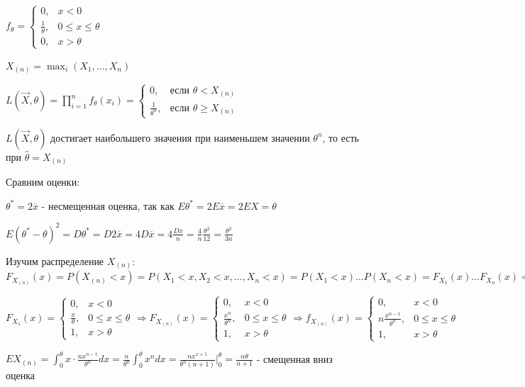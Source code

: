 \documentclass[12pt]{article}
\begin{document}
$f_\theta = \begin{cases}0, & x < 0 \\ \frac{1}{\theta}, & 0 \leq x \leq \theta \\ 0, & x > \theta \end{cases}$

$X_{(n)} = \max_i (X_1, \dots, X_n)$

$L(\vec{X}, \theta) = \prod_{i = 1}^n f_\theta (x_i) = 
\begin{cases}
    0, & \text{если } \theta < X_{(n)} \\ 
    \frac{1}{\theta^n}, & \text{если } \theta \geq X_{(n)}
\end{cases}$

$L(\vec{X}, \theta)$ достигает наибольшего значения при наименьшем значении $\theta^n$, то есть при $\hat{\theta} = X_{(n)}$

Сравним оценки:

$\theta^* = 2 \overline{x}$ - несмещенная оценка, так как $E\theta^* = 2E\overline{x} = 2E X = \theta$

$E(\theta^* - \theta)^2 = D\theta^* = D2\overline{x} = 4D\overline{x} = 4\frac{D\overline{x}}{n} = \frac{4}{n}\frac{\theta^2}{12} = \frac{\theta^2}{3n}$

Изучим распределение $X_{(n)}$: $F_{X_{(n)}}(x) = P(X_{(n)} < x) = P(X_1 < x, X_2 < x, \dots, X_n < x) = 
P(X_1 < x) \dots P(X_n < x) = F_{X_1}(x) \dots F_{X_n}(x) = F^n_{(x_1)}(x)$

$F_{X_1} (x) = \begin{cases}
    0, & x < 0 \\
    \frac{x}{\theta}, & 0 \leq x \leq \theta \\
    1, & x > \theta
\end{cases} \Longrightarrow F_{X_(n)}(x) = \begin{cases}
    0, & x < 0 \\
    \frac{x^n}{\theta^n}, & 0 \leq x \leq \theta \\
    1, & x > \theta
\end{cases} \Longrightarrow f_{X_(n)}(x) = \begin{cases}
    0, & x < 0 \\
    n\frac{x^{n - 1}}{\theta^n}, & 0 \leq x \leq \theta \\
    1, & x > \theta
\end{cases}$

$EX_{(n)} = \int_0^\theta x \cdot \frac{nx^{n - 1}}{\theta^n} dx = \frac{n}{\theta^n} \int_0^\theta x^n dx = \frac{n x^{x + 1}}{\theta^n (n + 1)} \Big|_0^\theta = 
\frac{n\theta}{n + 1}$ - смещенная вниз оценка
\end{document}
